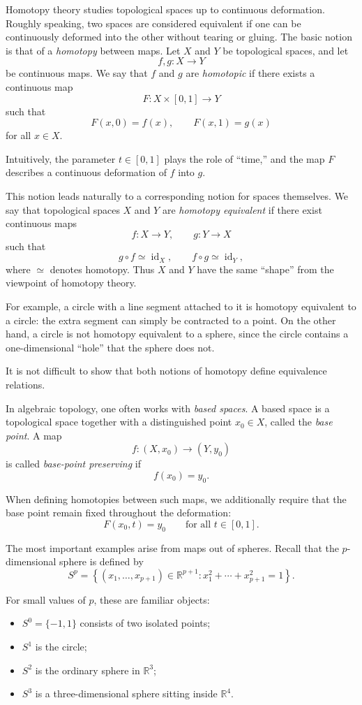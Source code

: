 \documentclass[12pt,reqno]{amsart}
\theoremstyle{plain}
\numberwithin{equation}{section}
\DeclareMathOperator{\id}{id}
\begin{document}
Homotopy theory studies topological spaces up to continuous deformation. Roughly speaking, two spaces are considered equivalent if one can be continuously deformed into the other without tearing or gluing.
The basic notion is that of a \emph{homotopy} between maps. Let $X$ and $Y$ be topological spaces, and let
\[
f,g:X\to Y
\]
be continuous maps. We say that $f$ and $g$ are \emph{homotopic} if there exists a continuous map
\[
F:X\times [0,1]\to Y
\]
such that
\[
F(x,0)=f(x), \qquad F(x,1)=g(x)
\]
for all $x\in X$.

Intuitively, the parameter $t\in [0,1]$ plays the role of ``time,'' and the map $F$ describes a continuous deformation of $f$ into $g$.

This notion leads naturally to a corresponding notion for spaces themselves. We say that topological spaces $X$ and $Y$ are \emph{homotopy equivalent} if there exist continuous maps
\[
f:X\to Y,
\qquad
g:Y\to X
\]
such that
\[
g\circ f \simeq \id_X,
\qquad
f\circ g \simeq \id_Y,
\]
where $\simeq$ denotes homotopy. Thus $X$ and $Y$ have the same ``shape'' from the viewpoint of homotopy theory.

For example, a circle with a line segment attached to it is homotopy equivalent to a circle: the extra segment can simply be contracted to a point. On the other hand, a circle is not homotopy equivalent to a sphere, since the circle contains a one-dimensional ``hole'' that the sphere does not.

It is not difficult to show that both notions of homotopy define equivalence relations.

\medskip

In algebraic topology, one often works with \emph{based spaces}. A based space is a topological space together with a distinguished point $x_0\in X$, called the \emph{base point}. A map
\[
f:(X,x_0)\to (Y,y_0)
\]
is called \emph{base-point preserving} if
\[
f(x_0)=y_0.
\]

When defining homotopies between such maps, we additionally require that the base point remain fixed throughout the deformation:
\[
F(x_0,t)=y_0
\qquad
\text{for all } t\in [0,1].
\]

The most important examples arise from maps out of spheres. Recall that the $p$-dimensional sphere is defined by
\[
S^p
=
\left\{
(x_1,\dots,x_{p+1})\in \mathbb R^{p+1}
:
x_1^2+\cdots+x_{p+1}^2=1
\right\}.
\]

For small values of $p$, these are familiar objects:

\begin{itemize}
    \item $S^0=\{-1,1\}$ consists of two isolated points;
    \item $S^1$ is the circle;
    \item $S^2$ is the ordinary sphere in $\mathbb R^3$;
    \item $S^3$ is a three-dimensional sphere sitting inside $\mathbb R^4$.
\end{itemize}
\end{document}
